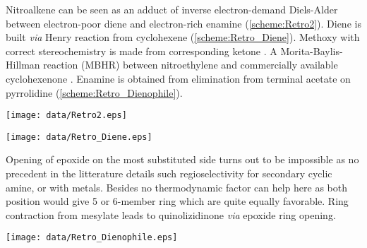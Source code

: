 Nitroalkene  can be seen as an adduct of inverse electron-demand Diels-Alder between electron-poor diene  and electron-rich enamine  (\ref{scheme:Retro2}).
Diene  is built \textit{via} Henry reaction from cyclohexene  (\ref{scheme:Retro_Diene}). Methoxy with correct stereochemistry is made from corresponding ketone . 
A Morita-Baylis-Hillman reaction (MBHR)\autocite{Morita68} between nitroethylene and commercially available cyclohexenone . Enamine  is obtained from elimination from terminal acetate on pyrrolidine  (\ref{scheme:Retro_Dienophile}).
\begin{figure''}
\centering
		\texttt{[image: data/Retro2.eps]}	
    \label{scheme:Retro2}
\end{figure''}
\vspace{-20pt}
\begin{figure''}
\centering
		\texttt{[image: data/Retro\_Diene.eps]}
        \label{scheme:Retro_Diene}
\end{figure''}
Opening of epoxide  on the most substituted side turns out to be impossible as no precedent in the litterature details such regioselectivity for secondary cyclic amine, or with metals. Besides no thermodynamic factor can help here  as both position would give 5 or 6-member ring which are quite equally favorable. Ring contraction from mesylate  leads to quinolizidinone  \textit{via} epoxide ring opening.
\begin{figure''}
\centering
 		\texttt{[image: data/Retro\_Dienophile.eps]}	 
    \label{scheme:Retro_Dienophile}
    \end{figure''}
